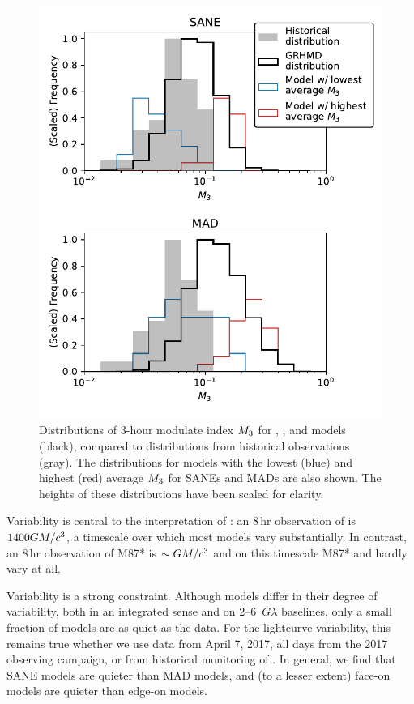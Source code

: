 \begin{figure}
  \centering
  \includegraphics[width=\columnwidth]{./figures/mi_hist.pdf}
  \caption{Distributions of 3-hour modulate index $M_{3}$ for \bhac, \kharma, and \hamr models (black), compared to distributions from historical observations (gray).
The distributions for models with the lowest (blue) and highest (red) average $M_{3}$ for SANEs and MADs are also shown.
The heights of these distributions have been scaled for clarity.}
  \label{fig:cmp_ALMA_var}
\end{figure}

Variability is central to  the interpretation of \sgra: an $8\,\mathrm{hr}$ observation of \sgra is $1400 GM/c^3$, a timescale over which most models vary substantially.
In contrast, an $8\,\mathrm{hr}$ observation of M87* is $\sim GM/c^3$ and on this timescale M87* and \sgra hardly vary at all.

Variability is a strong constraint.
Although models differ in their degree of variability, both in an integrated sense and on 2--6~$G\lambda$ baselines, only a small fraction of models are as quiet as the data.
For the lightcurve variability, this remains true whether we use data from April 7, 2017, all days from the 2017 observing campaign, or from historical monitoring of \sgra.
 In general, we find that SANE models are quieter than MAD models, and (to a lesser extent) face-on models are quieter than edge-on models.

